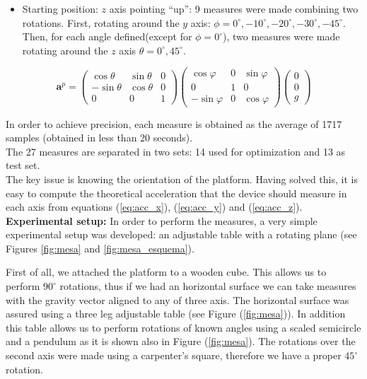 \documentclass[conference]{IEEEtran}
\newcommand{\refp}[1]{(\ref{#1})}
\begin{document}
\begin{itemize}
\item Starting position: $z$ axis pointing ``up'': 9 measures were made combining two rotations. First, rotating around the $y$ axis: $\phi =0^\circ, -10^\circ, -20^\circ, -30^\circ, -45^\circ$. Then, for each angle defined(except for $\phi = 0^\circ$), two measures were made rotating around the $z$ axis $\theta = 0^\circ, 45^\circ$.   \end{itemize}

\begin{scriptsize}
\begin{equation}
\mathbf{a}^p = \left(\begin{array}{ccc}
\cos \theta & \sin \theta & 0\\
-\sin \theta & \cos \theta & 0\\
0 & 0 & 1
\end{array}\right)\left(\begin{array}{ccc}
\cos \varphi & 0 &\sin \varphi\\
0 & 1 & 0\\
-\sin \varphi & 0 & \cos \varphi
\end{array}\right)\left(\begin{array}{c}
0\\
0\\
g
\end{array}\right)
\label{eq:acc_z}
\end{equation}
\end{scriptsize}
In order to achieve precision, each measure is obtained as the average of 1717 samples (obtained in less than 20 seconds).\\

The 27 measures are separated in two sets: 14 used for optimization and 13 as test set.\\

The key issue is knowing the orientation of the platform. Having solved this, it is easy to compute the theoretical acceleration that the device should measure in each axis from equations \refp{eq:acc_x}, \refp{eq:acc_y} and \refp{eq:acc_z}.\\

\textbf{Experimental setup:} In order to perform the measures, a very simple experimental setup was developed: an adjustable table with a rotating plane (see Figures \ref{fig:mesa} and \ref{fig:mesa_esquema}).

First of all, we attached the platform to a wooden cube. This allows us to perform $90^\circ$ rotations, thus if we had an horizontal surface we can take measures with the gravity vector aligned to any of three axis. The horizontal surface was assured using a three leg adjustable table (see Figure \refp{fig:mesa}). In addition this table allows us to perform rotations of known angles using a scaled semicircle and a pendulum as it is shown also in Figure \refp{fig:mesa}. The rotations over the second axis were made using a carpenter's square, therefore we have a proper $45^\circ$ rotation.\\
\end{document}
